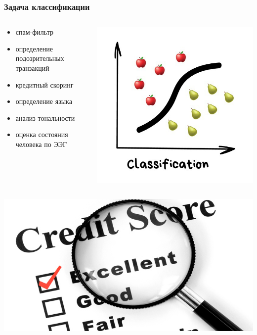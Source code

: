 \documentclass[aspectratio=169,newPxFont]{beamer}
\begin{document}
\begin{frame}
\frametitle{Задача классификации}
\begin{columns}
\begin{column}{.66\linewidth}
\begin{itemize}
	\item спам-фильтр
	\item определение подозрительных транзакций
	\item кредитный скоринг
	\item определение языка
	\item анализ тональности
	\item оценка состояния человека по ЭЭГ
\end{itemize}
\end{column}
\begin{column}{.4\linewidth}
	\hfill \includegraphics[width=0.9\linewidth]{class.jpg}
\end{column}
\end{columns}
\end{frame}

\begin{frame}{}
\centering \includegraphics[width=1\linewidth]{credit_score.jpg}\\
\end{frame}
\end{document}
